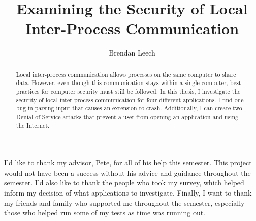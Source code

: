 \documentclass[midd]{thesis}
\title {Examining the Security of Local Inter-Process Communication}
\author {Brendan Leech}
\begin{document}
\maketitle
{}

\begin{abstract}
Local inter-process communication allows processes on the same computer to share data.  However, even though this communication stays within a single computer, best-practices for computer security must still be followed.  In this thesis, I investigate the security of local inter-process communication for four different applications.  I find one bug in parsing input that causes an extension to crash.  Additionally, I can create two Denial-of-Service attacks that prevent a user from opening an application and using the Internet.
\end{abstract}

\begin{acknowledgements}
I'd like to thank my advisor, Pete, for all of his help this semester.  This project would not have been a success without his advice and guidance throughout the semester.  I'd also like to thank the people who took my survey, which helped inform my decision of what applications to investigate.  Finally, I want to thank my friends and family who supported me throughout the semester, especially those who helped run some of my tests as time was running out.
\end{acknowledgements}

\contentspage
\tablelistpage   %
\figurelistpage

\normalspacing \setcounter{page}{1} 









\appendix





\end{document}
